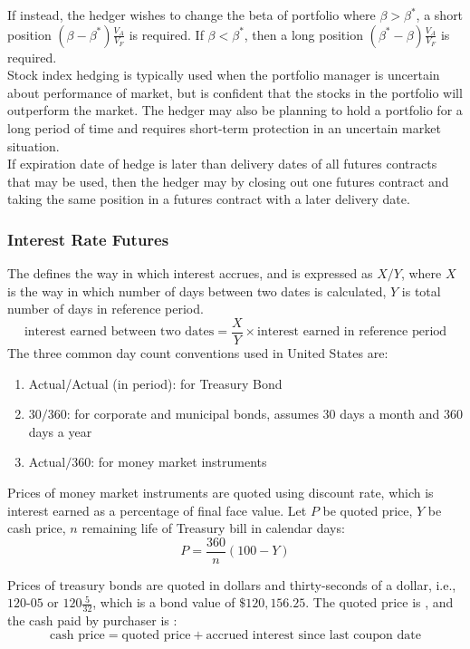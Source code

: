 If instead, the hedger wishes to change the beta of portfolio where $\beta > \beta^*$, a short position $(\beta - \beta^*)\frac{V_A}{V_F}$ is required. If $\beta < \beta^*$, then a long position $(\beta^* - \beta)\frac{V_A}{V_F}$ is required.\\

Stock index hedging is typically used when the portfolio manager is uncertain about performance of market, but is confident that the stocks in the portfolio will outperform the market. The hedger may also be planning to hold a portfolio for a long period of time and requires short-term protection in an uncertain market situation.\\

If expiration date of hedge is later than delivery dates of all futures contracts that may be used, then the hedger may  by closing out one futures contract and taking the same position in a futures contract with a later delivery date.

\subsubsection{Interest Rate Futures}

The  defines the way in which interest accrues, and is expressed as $X/Y$, where $X$ is the way in which number of days between two dates is calculated, $Y$ is total number of days in reference period.
\begin{equation}
\text{interest earned between two dates} = \frac{X}{Y} \times \text{interest earned in reference period} \nonumber
\end{equation}
The three common day count conventions used in United States are:
\begin{enumerate}[label=\roman*.]
\setlength{\itemsep}{0pt}
\item Actual/Actual (in period): for Treasury Bond
\item $30/360$: for corporate and municipal bonds, assumes $30$ days a month and $360$ days a year
\item Actual$/360$: for money market instruments
\end{enumerate}

Prices of money market instruments are quoted using discount rate, which is interest earned as a percentage of final face value. Let $P$ be quoted price, $Y$ be cash price, $n$ remaining life of Treasury bill in calendar days:
\begin{equation}
P = \frac{360}{n}(100 - Y) \nonumber
\end{equation}

Prices of treasury bonds are quoted in dollars and thirty-seconds of a dollar, i.e., $120$-$05$ or $120\frac{5}{32}$, which is a bond value of $\$120,156.25$. The quoted price is , and the cash paid by purchaser is :
\begin{equation}
\text{cash price} = \text{quoted price} + \text{accrued interest since last coupon date} \nonumber
\end{equation} 


